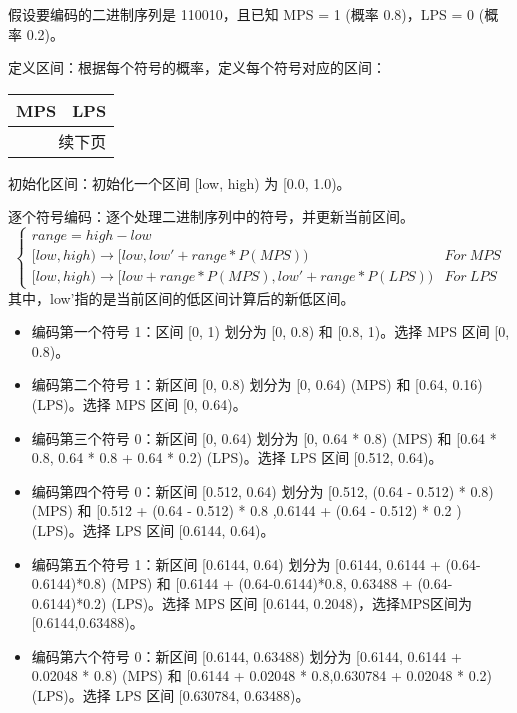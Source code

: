 \documentclass{/home/hi/Study/template/code}
\begin{document}
\begin{tcolorbox}
	\small
	假设要编码的二进制序列是 110010，且已知 MPS = 1 (概率 0.8)，LPS = 0 (概率 0.2)。
	\begin{serialNumber}
		\item 定义区间：根据每个符号的概率，定义每个符号对应的区间：
		\begin{longtable}{cc}
			\toprule
			\textbf{MPS} & \textbf{LPS} \\
			\midrule
			\endfirsthead
			\bottomrule()
			\multicolumn{2}{r}{续下页}
			\endfoot
			\bottomrule()
			\endlastfoot
			[0.0, 0.8)   & [0.8, 1.0)   \\
		\end{longtable}

		\item 初始化区间：初始化一个区间 [low, high) 为 [0.0, 1.0)。
		\item 逐个符号编码：逐个处理二进制序列中的符号，并更新当前区间。
		\begin{equation}
			\begin{cases}
				range = high - low                                                                    \\
				[low,high) \rightarrow  [low ,  low' + range * P( MPS ) )                 & For ~ MPS \\
				[low,high) \rightarrow  [low + range * P( MPS ) ,low' + range * P( LPS )) & For ~ LPS
			\end{cases}
		\end{equation}
		其中，low'指的是当前区间的低区间计算后的新低区间。

		\begin{itemize}
			\item 编码第一个符号 1：区间 [0, 1) 划分为 [0, 0.8) 和 [0.8, 1)。选择 MPS 区间 [0, 0.8)。
			\item 编码第二个符号 1：新区间 [0, 0.8) 划分为 [0, 0.64) (MPS) 和 [0.64, 0.16) (LPS)。选择 MPS 区间 [0, 0.64)。
			\item 编码第三个符号 0：新区间 [0, 0.64) 划分为 [0, 0.64 * 0.8) (MPS) 和 [0.64 * 0.8, 0.64 * 0.8 + 0.64 * 0.2) (LPS)。选择 LPS 区间 [0.512, 0.64)。
			\item 编码第四个符号 0：新区间 [0.512, 0.64) 划分为 [0.512, (0.64 - 0.512) * 0.8) (MPS) 和 [0.512 + (0.64 - 0.512) * 0.8 ,0.6144 + (0.64 - 0.512) * 0.2 ) (LPS)。选择 LPS 区间 [0.6144, 0.64)。
			\item 编码第五个符号 1：新区间 [0.6144, 0.64) 划分为 [0.6144, 0.6144 + (0.64-0.6144)*0.8) (MPS) 和 [0.6144 + (0.64-0.6144)*0.8, 0.63488 + (0.64-0.6144)*0.2) (LPS)。选择 MPS 区间 [0.6144, 0.2048)，选择MPS区间为 [0.6144,0.63488)。
			\item 编码第六个符号 0：新区间 [0.6144, 0.63488) 划分为 [0.6144, 0.6144 + 0.02048 * 0.8) (MPS) 和 [0.6144 + 0.02048 * 0.8,0.630784 + 0.02048 * 0.2) (LPS)。选择 LPS 区间 [0.630784, 0.63488)。
		\end{itemize}


\end{serialNumber}
\end{tcolorbox}
\end{document}
